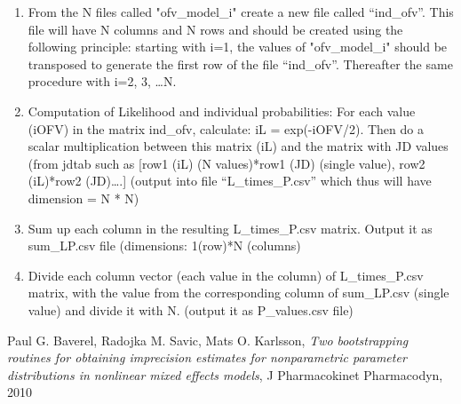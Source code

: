 \documentclass[a4paper,12pt]{article}
\begin{document}
\begin{enumerate}
\begin{enumerate}
	\end{enumerate}
\item From the N files called "ofv\_model\_i" create a new file called “ind\_ofv”. This file will have N columns and N rows and should be created using the following principle: starting with i=1, the values of "ofv\_model\_i" should be transposed to generate the first row of the file “ind\_ofv”. Thereafter the same procedure with i=2, 3, …N. 
\item Computation of Likelihood and individual probabilities: For each value (iOFV) in the matrix ind\_ofv, calculate:  iL = exp(-iOFV/2). Then do a scalar multiplication between this matrix (iL) and the matrix with JD values (from jdtab such as 
	[row1 (iL) (N values)*row1 (JD) (single value), row2 (iL)*row2 (JD)….] 
	(output into file “L\_times\_P.csv” which thus will have dimension = N * N)
\item Sum up each column in the resulting L\_times\_P.csv matrix. Output it as sum\_LP.csv file (dimensions: 1(row)*N (columns)
\item Divide each column vector (each value in the column)  of L\_times\_P.csv matrix, with the value from the corresponding column of sum\_LP.csv (single value) and divide it with N. (output it as P\_values.csv file)
\end{enumerate}

\begin{thebibliography}{1}
 Paul G. Baverel, Radojka M. Savic, Mats O. Karlsson, {\em Two bootstrapping routines for obtaining imprecision estimates for nonparametric parameter distributions in nonlinear mixed effects models}, J Pharmacokinet Pharmacodyn, 2010
\end{thebibliography}
\end{document}
